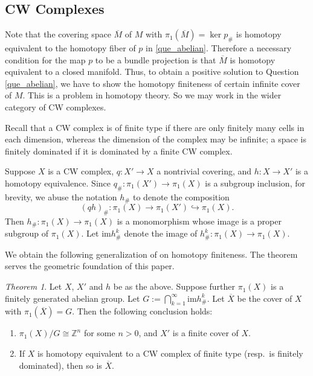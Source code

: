 \documentclass[12pt]{amsart}
\theoremstyle{plain}
\theoremstyle{definition}
\theoremstyle{question}
\theoremstyle{remark}
\theoremstyle{assumption}
\numberwithin{equation}{section}
\theoremstyle{bigthm}
\newtheorem{bigthm}{Theorem}
\begin{document}
\subsection{CW Complexes}
Note that the covering space $\overline M$ of $M$ with $\pi_{1} (\overline{M}) = \ker p_{\#}$ is homotopy equivalent to the homotopy fiber of $p$ in \eqref{que_abelian}. Therefore a necessary condition for the map $p$ to be a bundle projection is that $\overline{M}$ is homotopy equivalent to a closed manifold. Thus, to obtain a positive solution to Question \ref{que_abelian}, we have to show the homotopy finiteness of certain infinite cover of $M$. This is a problem in homotopy theory. So we may work in the wider category of CW complexes.

Recall that a CW complex is of finite type if there are only finitely many cells in each dimension, whereas the dimension of the complex may be infinite; a space is finitely dominated if it is dominated by a finite CW complex.

Suppose $X$ is a CW complex, $q \colon  X' \rightarrow X$ a nontrivial covering, and $h \colon  X \rightarrow X'$ is a homotopy equivalence. Since $q_{\#} \colon  \pi_{1} (X') \rightarrow \pi_{1} (X)$ is a subgroup inclusion, for brevity, we abuse the notation $h_{\#}$ to denote the composition
\[
(qh)_{\#} \colon  \pi_{1} (X) \rightarrow \pi_{1} (X') \hookrightarrow \pi_{1} (X).
\]
Then $h_{\#} \colon  \pi_{1} (X) \rightarrow \pi_{1} (X)$ is a monomorphism whose image is a proper subgroup of $\pi_{1} (X)$. Let $\mathrm{im} h_{\#}^{k}$ denote the image of $h_{\#}^{k} \colon  \pi_{1} (X) \rightarrow \pi_{1} (X)$.

We obtain the following generalization of \cite[Theorem~A]{Qin_Su_Wang} on homotopy finiteness. The theorem serves the geometric foundation of this paper.
\begin{bigthm}\label{thm_homotopy_finite}
Let $X$, $X'$ and $h$ be as the above. Suppose further $\pi_{1} (X)$ is a finitely generated abelian group. Let $G := \bigcap_{k=1}^{\infty} \mathrm{im} h_{\#}^{k}$. Let $\overline{X}$ be the cover of $X$ with $\pi_{1} (\overline{X}) =G$. Then the following conclusion holds:
\begin{enumerate}
\item $\pi_{1} (X) / G \cong \mathbb{Z}^{n}$ for some $n>0$, and $X'$ is a finite cover of $X$.

\item If $X$ is homotopy equivalent to a CW complex of finite type (resp.~is finitely dominated), then so is $\overline{X}$.
\end{enumerate}
\end{bigthm}
\end{document}
